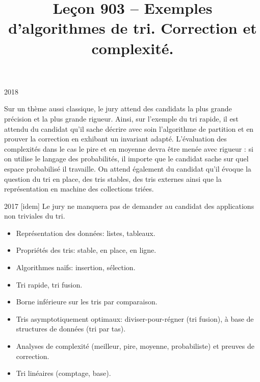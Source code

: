 \documentclass{agregfiche}
\title{Leçon 903 -- Exemples d'algorithmes de tri. Correction et complexité.}
\begin{document}
\maketitle

\secrapports

\begin{rapport}{2018}
	
	Sur un thème aussi classique, le jury attend des candidats la plus grande précision et la plus grande rigueur.
	Ainsi, sur l'exemple du tri rapide, il est attendu du candidat qu'il sache décrire avec soin l'algorithme de partition et en prouver la correction en exhibant un invariant adapté. L'évaluation des complexités dans le cas le pire et en moyenne devra être menée avec rigueur : si on utilise le langage des probabilités, il importe que le candidat sache sur quel espace probabilisé il travaille.
	On attend également du candidat qu'il évoque la question du tri en place, des tris stables, des tris externes ainsi que la représentation en machine des collections triées.
	
\end{rapport}

\begin{rapport}{2017}
    [idem]
    Le jury ne manquera pas de demander au candidat des applications non triviales du tri.
\end{rapport}

\secindispensables

\begin{itemize}
    \item Représentation des données: listes, tableaux. 
    \item Propriétés des tris: stable, en place, en ligne.
    \item Algorithmes naïfs: insertion, sélection.
   \item Tri rapide, tri fusion.
\end{itemize}

\secasavoir
\begin{itemize}
    \item Borne inférieure sur les tris par comparaison.
    \item Tris asymptotiquement optimaux: diviser-pour-régner (tri fusion), à base de structures de données (tri par tas).
	\item Analyses de complexité (meilleur, pire, moyenne, probabiliste) et preuves de correction.
	\item Tri linéaires (comptage, base).
\end{itemize}
\end{document}
